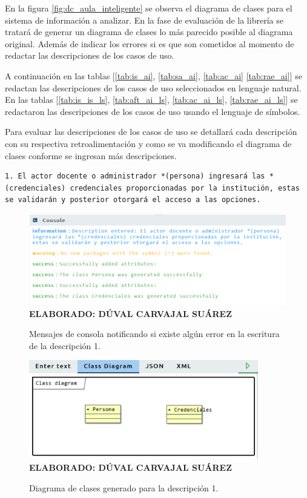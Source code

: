 En la figura \ref{fig:dc_aula_inteligente} se observa el diagrama de clases para el sistema de información a analizar. En la fase de evaluación de la librería se tratará de generar un diagrama de clases lo más parecido posible al diagrama original. Además de indicar los errores si es que son cometidos al momento de redactar las descripciones de los casos de uso. 

A continuación en las tablas [\ref{tab:is_ai}, \ref{tab:sa_ai}, \ref{tab:ac_ai} \ref{tab:rae_ai}] se redactan las descripciones de los casos de uso seleccionados en lenguaje natural. En las tablas [\ref{tab:is_is_ls}, \ref{tab:aft_ai_ls}, \ref{tab:ac_ai_ls}, \ref{tab:rae_ai_ls}] se redactaron las descripciones de los casos de uso usando el lenguaje de símbolos.

Para evaluar las descripciones de los casos de uso se detallará cada descripción con su respectiva retroalimentación y como se va modificando el diagrama de clases conforme se ingresan más descripciones.

\begin{lstlisting}[]
	1. El actor docente o administrador *(persona) ingresará las *(credenciales) credenciales proporcionadas por la institución, estas se validarán y posterior otorgará el acceso a las opciones. \end{lstlisting}

\begin{figure}[h!]
	\caption{Mensajes de consola notificando si existe algún error en la escritura de la descripción 1.}
	\includegraphics[width=12cm]{img/not-eva-001.png}
	\label{fig:not_eva_001}
	\textbf{\\ ELABORADO: DÚVAL CARVAJAL SUÁREZ}
\end{figure}

\begin{figure}[H]
	\caption{Diagrama de clases generado para la descripción 1.}
	\includegraphics[width=10cm]{img/dc-eva-001.png}
	\label{fig:dc_eva_001}
	\textbf{\\ ELABORADO: DÚVAL CARVAJAL SUÁREZ}
\end{figure}

